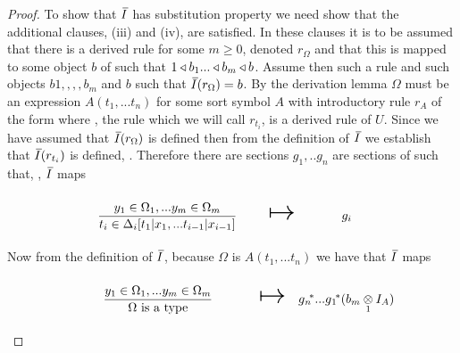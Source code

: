 \begin{proof}
To show that $\Ibar$ has substitution property we need show that the additional clauses, (iii) and (iv), are satisfied.
In these clauses it is to be assumed that there is a derived rule \omegarule[,] for some $m \geq 0$, denoted $r_\Omega$
and that this is mapped to some object $b$ of \catcw such that $1 \triangleleft b_1 ... \triangleleft b_m \triangleleft b$. Assume then such a rule and such objects
$b1,,,,b_m$ and $b$  such that $\Ibar(r_\Omega)=b$. By the derivation lemma $\Omega$ must be an expression $A(t_1,...t_n)$ for some sort symbol $A$ 
with introductory rule $r_A$ of the form  where \foreachi, the rule 
 which we will call $r_{t_i}$, is a derived rule of $U$.
Since  we have assumed that $\Ibar(r_\Omega)$ is defined then 
from the definition of $\Ibar$ we establish that $\Ibar(r_{t_i})$ is defined, \foreachi. Therefore there are sections  $g_1,..g_n$ are sections of \catcw such that, 
\foreachi, $\Ibar$ maps
\begin{equation}
\label{timapping}
\begin{array}{c c c}
\forceSOURCEwidth & & \forceTARGETwidth \\ [-0.1cm]
\tirule    & \Imapsto & g_i \\ [0.4cm]
\end{array}
\end{equation} 
Now from the definition of $\Ibar$, because $\Omega$ is $A(t_1,...t_n)$  we have that $\Ibar$ maps
\begin{equation*}
\begin{array}{c c c}
\forceSOURCEwidth & & \forceTARGETwidth \\ [-0.1cm]
\omegarule   & \Imapsto & \gnvectorstar(\crossx{b_m}{I_A}{1})\\ [0.4cm]
\end{array}
\end{equation*} 


\end{proof}
